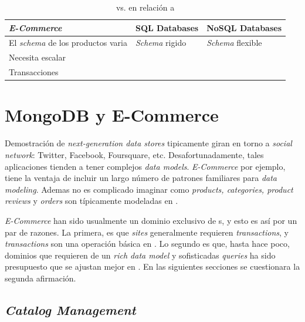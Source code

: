 \begin{table}[h!]
    \tiny
   
\begin{tabular}{ |L{0.1\paperwidth}|L{0.3\paperwidth}|L{0.3\paperwidth}|}
\hline
	\textit{E-Commerce}&
	SQL Databases &
	NoSQL Databases
 
\\ \hline
	El \textit{schema} de los productos varia&
	\textit{Schema} rigido&
	\textit{Schema} flexible
\\ \hline
	Necesita escalar&
	&
	
\\ \hline
	Transacciones&
	&
	
\\ \hline
\end{tabular}
    \caption{  vs.  en relación a \textit{}}
    \label{tab:SQL_vs_noSQL_summary}
\end{table}


\section{MongoDB y E-Commerce \cite{online_mongodb_ecommerce}}\label{cap:estadoArte:MongoDB_ECommerce}

Demostración de \textit{next-generation data stores} tipicamente giran en torno a \textit{social network}: Twitter, Facebook, Foursquare, etc. Desafortunadamente, tales aplicaciones tienden a tener complejos \textit{data models}. \textit{E-Commerce} por ejemplo, tiene la ventaja de incluir un largo número de patrones familiares para \textit{data modeling}. Ademas no es complicado imaginar como \textit{products, categories, product reviews} y \textit{orders} son típicamente modeladas en .

\textit{E-Commerce} han sido usualmente un dominio exclusivo de s, y esto es así por un par de razones. La primera, es que \textit{ sites} generalmente requieren \textit{transactions}, y \textit{transactions} son una operación básica en . Lo segundo es que, hasta hace poco, dominios que requieren de un \textit{rich data model} y sofisticadas \textit{queries} ha sido presupuesto que se ajustan mejor en . En las siguientes secciones se cuestionara la segunda afirmación. 

\subsection{\textit{Catalog Management}}

